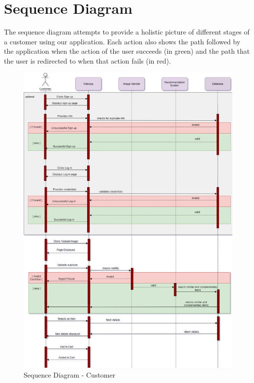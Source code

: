 \section{Sequence Diagram}
The sequence diagram attempts to provide a holistic picture of different stages of a customer using our application. Each action also shows the path followed by the application when the action of the user succeeds (in green) and the path that the user is redirected to when that action fails (in red).
\begin{figure}[H]
\includegraphics[width=12cm]{images/SequenceDiag1.pdf} 
\centering
\caption{Sequence Diagram - Customer}
\label{sequence: one}
\end{figure}